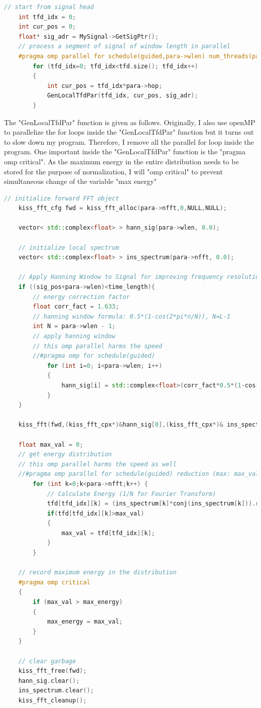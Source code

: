 \documentclass[11pt,letter]{article}
\begin{document}
\begin{lstlisting}[language=C++]
    // start from signal head
    int tfd_idx = 0;
    int cur_pos = 0;
    float* sig_adr = MySignal->GetSigPtr();
    // process a segment of signal of window length in parallel
    #pragma omp parallel for schedule(guided,para->wlen) num_threads(para_par->nthread) 
        for (tfd_idx=0; tfd_idx<tfd.size(); tfd_idx++)
        {
            int cur_pos = tfd_idx*para->hop;
            GenLocalTfdPar(tfd_idx, cur_pos, sig_adr);  
        }
\end{lstlisting}


The "GenLocalTfdPar" function is given as follows. Originally, I also use openMP to parallelize the for loops inside the "GenLocalTfdPar" function but it turns out to slow down my program. Therefore, I remove all the parallel for loop inside the program. One important inside the "GenLocalTfdPar" function is the "pragma omp critical". As the maximum energy in the entire distribution needs to be stored for the purpose of normalization, I will "omp critical" to prevent simultaneous change of the variable "max energy"

\begin{lstlisting}[language=C++]
    // initialize forward FFT object
    kiss_fft_cfg fwd = kiss_fft_alloc(para->nfft,0,NULL,NULL);

    vector< std::complex<float> > hann_sig(para->wlen, 0.0);

    // initialize local spectrum
    vector< std::complex<float> > ins_spectrum(para->nfft, 0.0);
    
    // Apply Hanning Window to Signal for improving frequency resolution
    if ((sig_pos+para->wlen)<time_length){
        // energy correction factor
        float corr_fact = 1.633;
        // hanning window formula: 0.5*(1-cos(2*pi*n/N)), N=L-1
        int N = para->wlen - 1;
        // apply hanning window
        // this omp parallel harms the speed
        //#pragma omp for schedule(guided)
            for (int i=0; i<para->wlen; i++)
            {
                hann_sig[i] = std::complex<float>(corr_fact*0.5*(1-cos(2*3.1415926*i/N))*sig_adr[sig_pos+i],0.0);
            }
    }

    kiss_fft(fwd,(kiss_fft_cpx*)&hann_sig[0],(kiss_fft_cpx*)& ins_spectrum[0]);

    float max_val = 0;
    // get energy distribution
    // this omp parallel harms the speed as well
    //#pragma omp parallel for schedule(guided) reduction (max: max_val) //num_threads(para_par->nthread)
        for (int k=0;k<para->nfft;k++) {
            // Calculate Energy (1/N for Fourier Transform)
            tfd[tfd_idx][k] = (ins_spectrum[k]*conj(ins_spectrum[k])).real() / float(para->nfft);  
            if(tfd[tfd_idx][k]>max_val)
            {
                max_val = tfd[tfd_idx][k];
            }
        }

    // record maximum energy in the distribution
    #pragma omp critical
    {
        if (max_val > max_energy)
        {
            max_energy = max_val;
        }
    }

    // clear garbage
    kiss_fft_free(fwd);
    hann_sig.clear();
    ins_spectrum.clear();
    kiss_fft_cleanup();
\end{lstlisting}
\end{document}
